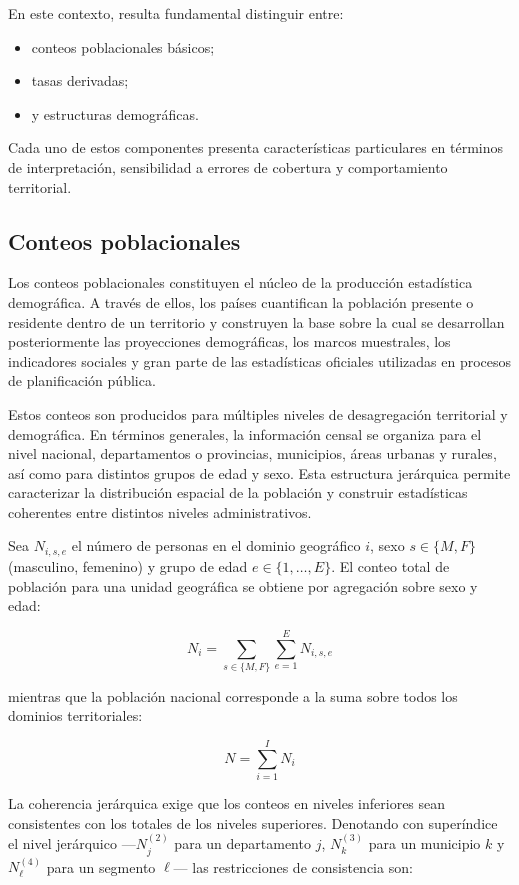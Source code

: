 \documentclass[
  spanish,
]{book}
\providecommand{\tightlist}{%
  \setlength{\itemsep}{0pt}\setlength{\parskip}{0pt}}
\begin{document}
En este contexto, resulta fundamental distinguir entre:

\begin{itemize}
\tightlist
\item
  conteos poblacionales básicos;
\item
  tasas derivadas;
\item
  y estructuras demográficas.
\end{itemize}

Cada uno de estos componentes presenta características particulares en términos de interpretación, sensibilidad a errores de cobertura y comportamiento territorial.

\subsection{Conteos poblacionales}\label{conteos-poblacionales}

Los conteos poblacionales constituyen el núcleo de la producción estadística demográfica. A través de ellos, los países cuantifican la población presente o residente dentro de un territorio y construyen la base sobre la cual se desarrollan posteriormente las proyecciones demográficas, los marcos muestrales, los indicadores sociales y gran parte de las estadísticas oficiales utilizadas en procesos de planificación pública.

Estos conteos son producidos para múltiples niveles de desagregación territorial y demográfica. En términos generales, la información censal se organiza para el nivel nacional, departamentos o provincias, municipios, áreas urbanas y rurales, así como para distintos grupos de edad y sexo. Esta estructura jerárquica permite caracterizar la distribución espacial de la población y construir estadísticas coherentes entre distintos niveles administrativos.

Sea \(N_{i,s,e}\) el número de personas en el dominio geográfico \(i\), sexo \(s \in \{M, F\}\) (masculino, femenino) y grupo de edad \(e \in \{1, \ldots, E\}\). El conteo total de población para una unidad geográfica se obtiene por agregación sobre sexo y edad:

\[
N_i = \sum_{s \in \{M,F\}} \sum_{e=1}^{E} N_{i,s,e}
\]

mientras que la población nacional corresponde a la suma sobre todos los dominios territoriales:

\[
N = \sum_{i=1}^{I} N_i
\]

La coherencia jerárquica exige que los conteos en niveles inferiores sean consistentes con los totales de los niveles superiores. Denotando con superíndice el nivel jerárquico ---\(N_j^{(2)}\) para un departamento \(j\), \(N_k^{(3)}\) para un municipio \(k\) y \(N_\ell^{(4)}\) para un segmento \(\ell\)--- las restricciones de consistencia son:
\end{document}
